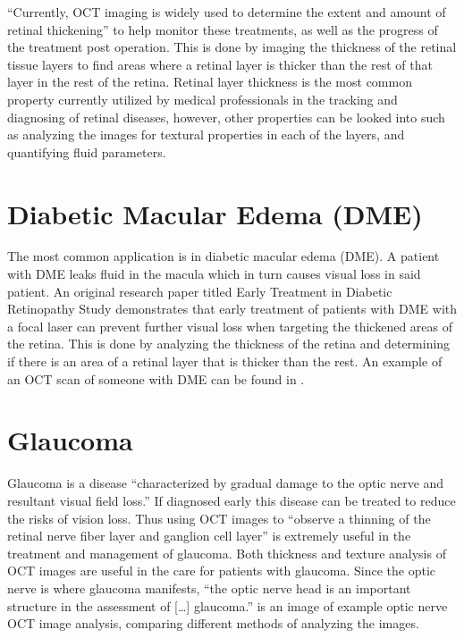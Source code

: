 “Currently, OCT imaging is widely used to determine the extent and amount of retinal thickening” \cite{} to help monitor these treatments, as well as the progress of the treatment post operation.  This is done by imaging the thickness of the retinal tissue layers to find areas where a retinal layer is thicker than the rest of that layer in the rest of the retina.  Retinal layer thickness is the most common property currently utilized by medical professionals in the tracking and diagnosing of retinal diseases, however, other properties can be looked into such as analyzing the images for textural properties in each of the layers, and quantifying fluid parameters. \cite{}

\section{Diabetic Macular Edema (DME)}
The most common application is in diabetic macular edema (DME). \cite{}  A patient with DME  leaks fluid in the macula which in turn causes visual loss in said patient.  An original research paper titled Early Treatment in Diabetic Retinopathy Study demonstrates that early treatment of patients with DME with a focal laser can prevent further visual loss when targeting the thickened areas of the retina. \cite{}  This is done by analyzing the thickness of the retina and determining if there is an area of a retinal layer that is thicker than the rest.  An example of an OCT scan of someone with DME can be found in  .  


\section{Glaucoma}
Glaucoma is a disease “characterized by gradual damage to the optic nerve and resultant visual field loss.” \cite{}  If diagnosed early this disease can be treated to reduce the risks of vision loss.  Thus using OCT images to “observe a thinning of the retinal nerve fiber layer and ganglion cell layer” is extremely useful in the treatment and management of glaucoma. \cite{}  Both thickness and texture analysis of OCT images are useful in the care for patients with glaucoma.   Since the optic nerve is where glaucoma manifests, “the optic nerve head is an important structure in the assessment of […] glaucoma.” \cite{}   is an image of example optic nerve OCT image analysis, comparing different methods of analyzing the images.

